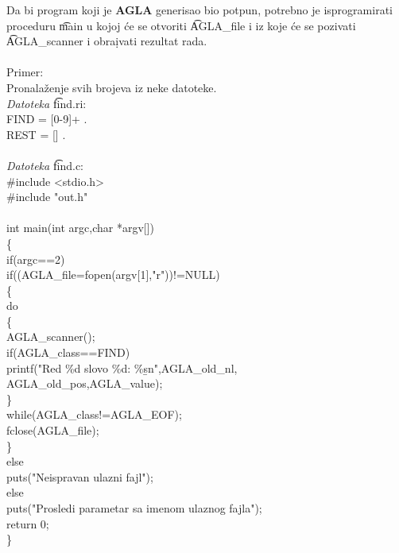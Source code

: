 %
%
      Da bi program koji je {\bf AGLA} generisao bio potpun, potrebno je
      isprogramirati proceduru \t{main} u kojoj \'ce se otvoriti
      \t{AGLA\_file} i iz koje \'ce se pozivati \t{AGLA\_scanner} i
      obra\d ivati rezultat rada.\\
      \\
      Primer:\\
      Pronala\v zenje svih brojeva iz neke datoteke.\\
      {\sl Datoteka} \t{find.ri}:\\
      \t
      {
        FIND = [0-9]+ .\\
        REST = [\x] .\\
      }\\
      {\sl Datoteka} \t{find.c}:\\
      \t
      {
        \#include <stdio.h>\\
        \#include "out.h"\\
        \\
        int main(int argc,char *argv[])\\
        \{\\
        {\s\s}if(argc==2)\\
        {\s\s\s\s}if((AGLA\_file=fopen(argv[1],"r"))!=NULL)\\
        {\s\s\s\s}\{\\
        {\s\s\s\s\s\s}do\\
        {\s\s\s\s\s\s}\{\\
        {\s\s\s\s\s\s\s\s}AGLA\_scanner();\\
        {\s\s\s\s\s\s\s\s}if(AGLA\_class==FIND)\\
        {\s\s\s\s\s\s\s\s\s\s}printf("Red \%d slovo \%d: \%s{\b}n",AGLA\_old\_nl,\\
        {\s\s\s\s\s\s\s\s\s\s\s\s}AGLA\_old\_pos,AGLA\_value);\\
        {\s\s\s\s\s\s}\}\\
        {\s\s\s\s\s\s}while(AGLA\_class!=AGLA\_EOF);\\
        {\s\s\s\s\s\s}fclose(AGLA\_file);\\
        {\s\s\s\s}\}\\
        {\s\s\s\s}else\\
        {\s\s\s\s\s\s}puts("Neispravan ulazni fajl");\\
        {\s\s}else\\
        {\s\s\s\s}puts("Prosledi parametar sa imenom ulaznog fajla");\\
        {\s\s}return 0;\\
        \}\\
      }\\
